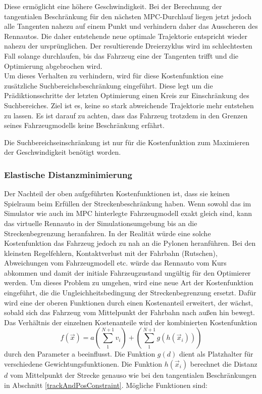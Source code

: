 \documentclass{like}
\begin{document}
Diese ermöglicht eine höhere Geschwindigkeit. Bei der Berechnung der tangentialen Beschränkung für den nächsten \ac{MPC}-Durchlauf liegen jetzt jedoch alle Tangenten nahezu auf einem Punkt und verhindern daher das Ausscheren des Rennautos. Die daher entstehende neue optimale Trajektorie entspricht wieder nahezu der ursprünglichen. Der resultierende Dreierzyklus wird im schlechtesten Fall solange durchlaufen, bis das Fahrzeug eine der Tangenten trifft und die Optimierung abgebrochen wird.\\
Um dieses Verhalten zu verhindern, wird für diese Kostenfunktion eine zusätzliche Suchbereichsbeschränkung eingeführt. Diese legt um die Prädiktionsschritte der letzten Optimierung einen Kreis zur Einschränkung des Suchbereiches. Ziel ist es, keine so stark abweichende Trajektorie mehr entstehen zu lassen. Es ist darauf zu achten, dass das Fahrzeug trotzdem in den Grenzen seines Fahrzeugmodells keine Beschränkung erfährt. 

Die Suchbereichseinschränkung ist nur für die Kostenfunktion zum Maximieren der Geschwindigkeit benötigt worden.

\subsubsection*{Elastische Distanzminimierung}
Der Nachteil der oben aufgeführten Kostenfunktionen ist, dass sie keinen Spielraum beim Erfüllen der Streckenbeschränkung haben. 
Wenn sowohl das im Simulator wie auch im  \ac{MPC} hinterlegte Fahrzeugmodell exakt gleich sind, kann das virtuelle Rennauto in der Simulationsumgebung bis an die Streckenbegrenzung heranfahren. In der Realität würde eine solche Kostenfunktion das Fahrzeug jedoch zu nah an die Pylonen heranführen. Bei den kleinsten Regelfehlern, Kontaktverlust mit der Fahrbahn (Rutschen), Abweichungen vom Fahrzeugmodell etc. würde das Rennauto vom Kurs abkommen und damit der initiale Fahrzeugzustand ungültig für den Optimierer werden. Um dieses Problem zu umgehen, wird eine neue Art der Kostenfunktion eingeführt, die die Ungleichheitsbedingung der Streckenbegrenzung ersetzt. Dafür wird eine der oberen Funktionen durch einen Kostenanteil erweitert, der wächst, sobald sich das Fahrzeug vom Mittelpunkt der Fahrbahn nach außen hin bewegt. Das Verhältnis der einzelnen Kostenanteile wird der kombinierten Kostenfunktion  
\begin{equation}
	f(\vec{x}) = a \left(\sum_{1}^{N+1} v_i \right) + \left(\sum_{1}^{N+1} g \left(h \left(\vec{x}_i \right) \right) \right)
\end{equation}
durch den Parameter a beeinflusst. 
Die Funktion $g(d)$ dient als Platzhalter für verschiedene Gewichtungsfunktionen. Die Funktion $h(\vec{x}_i)$ berechnet die Distanz \(d\) vom Mittelpunkt der Strecke genauso wie bei den tangentialen Beschränkungen in Abschnitt \ref{trackAndPosConstraint}. Mögliche Funktionen sind:
\end{document}
